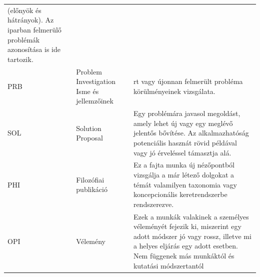 \documentclass[12pt,magyar,a4paper,oneside]{scrreprt}
\begin{document}
\begin{longtable}[]{@{}lll@{}}
\begin{minipage}[t]{0.52\columnwidth}
(előnyök és hátrányok). Az iparban felmerülő problémák azonosítása is
ide tartozik.\strut
\end{minipage}\tabularnewline
\begin{minipage}[t]{0.05\columnwidth}\raggedright
PRB\strut
\end{minipage} & \begin{minipage}[t]{0.34\columnwidth}\raggedright
Problem Investigation Isme és jellemzőinek\strut
\end{minipage} & \begin{minipage}[t]{0.52\columnwidth}\raggedright
rt vagy újonnan felmerült probléma körülményeinek vizsgálata.\strut
\end{minipage}\tabularnewline
\begin{minipage}[t]{0.05\columnwidth}\raggedright
SOL\strut
\end{minipage} & \begin{minipage}[t]{0.34\columnwidth}\raggedright
Solution Proposal\strut
\end{minipage} & \begin{minipage}[t]{0.52\columnwidth}\raggedright
Egy problémára javasol megoldást, amely lehet új vagy egy meglévő
jelentős bővítése. Az alkalmazhatóság potenciális hasznát rövid példával
vagy jó érveléssel támasztja alá.\strut
\end{minipage}\tabularnewline
\begin{minipage}[t]{0.05\columnwidth}\raggedright
PHI\strut
\end{minipage} & \begin{minipage}[t]{0.34\columnwidth}\raggedright
Filozófiai publikáció\strut
\end{minipage} & \begin{minipage}[t]{0.52\columnwidth}\raggedright
Ez a fajta munka új nézőpontból vizsgálja a már létező dolgokat a témát
valamilyen taxonomia vagy koncepcionális keretrendszerbe
rendszerezve.\strut
\end{minipage}\tabularnewline
\begin{minipage}[t]{0.05\columnwidth}\raggedright
OPI\strut
\end{minipage} & \begin{minipage}[t]{0.34\columnwidth}\raggedright
Vélemény\strut
\end{minipage} & \begin{minipage}[t]{0.52\columnwidth}\raggedright
Ezek a munkák valakinek a személyes véleményét fejezik ki, miszerint egy
adott módszer jó vagy rossz, illetve mi a helyes eljárás egy adott
esetben. Nem függenek más munkáktól és kutatási módszertantól\strut

\end{minipage}
\end{longtable}
\end{document}
